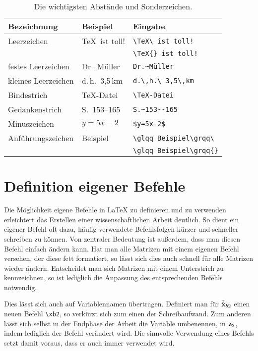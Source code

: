 \begin{table}
  \caption{Die wichtigsten Abstände und Sonderzeichen.}
  \label{tab:Sonderzeichen}
  \setlength{\tabcolsep}{1em}\centering
  \begin{tabular}{lll}\hline
    Bezeichnung			&	Beispiel				&	Eingabe\\\hline
    Leerzeichen			&	\TeX\ ist toll!			&	\verb*|\TeX\ ist toll!|\\
					    &							&	\verb*|\TeX{} ist toll!|\\
    festes Leerzeichen	&	Dr.~Müller				&	\verb|Dr.~Müller|\\
    kleines Leerzeichen	&	d.\,h.\ 3,5\,km			&	\verb*|d.\,h.\ 3,5\,km|\\
    Bindestrich			&	\TeX-Datei				&	\verb|\TeX-Datei|\\
    Gedankenstrich		&	S.~153--165				&	\verb|S.~153--165|\\
    Minuszeichen		&	$y=5x-2$				&	\verb|$y=5x-2$|\\
    Anführungszeichen	&	\glqq Beispiel\grqq\	&	\verb*|\glqq Beispiel\grqq\ |\\
						&							&	\verb*|\glqq Beispiel\grqq{}|\\\hline
  \end{tabular}
\end{table}



\section{Definition eigener Befehle}
Die Möglichkeit eigene Befehle in \LaTeX{} zu definieren und zu verwenden erleichtert das Erstellen einer wissenschaftlichen Arbeit deutlich.
So dient ein eigener Befehl oft dazu, häufig verwendete Befehlsfolgen kürzer und schneller schreiben zu können.
Von zentraler Bedeutung ist außerdem, dass man diesen Befehl einfach ändern kann.
Hat man \zB alle Matrizen mit einem eigenen Befehl versehen, der diese fett formatiert, so lässt sich dies auch schnell für alle Matrizen wieder ändern.
Entscheidet man sich Matrizen mit einem Unterstrich zu kennzeichnen, so ist lediglich die Anpassung des entsprechenden Befehls notwendig.

Dies lässt sich auch auf Variablennamen übertragen.
Definiert man \zB für $\tilde{\hat{{\boldsymbol{\mathrm{x}}}}}_{b2}$ einen neuen Befehl \verb|\xb2|, so verkürzt sich zum einen der Schreibaufwand.
Zum anderen lässt sich selbst in der Endphase der Arbeit die Variable umbenennen, \zB in ${\boldsymbol{\mathrm{z}}}_2$, indem lediglich der Befehl verändert wird.
Die sinnvolle Verwendung eines Befehls setzt damit voraus, dass er auch immer verwendet wird.

